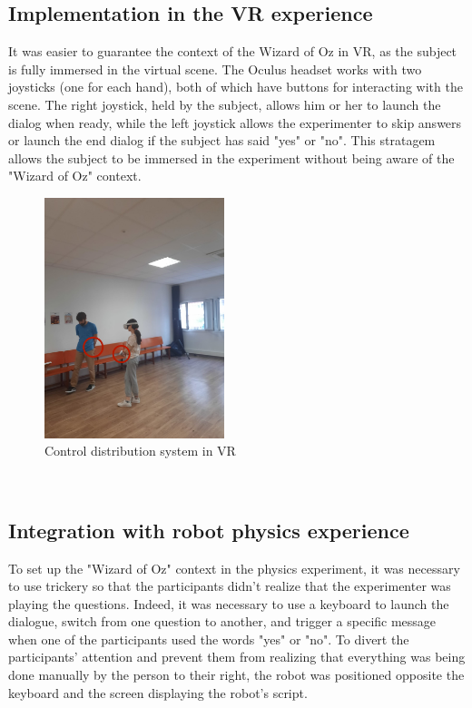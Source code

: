 \subsection{Implementation in the VR experience}
It was easier to guarantee the context of the Wizard of Oz in VR, as the subject is fully immersed in the virtual scene. The Oculus headset works with two joysticks (one for each hand), both of which have buttons for interacting with the scene. The right joystick, held by the subject, allows him or her to launch the dialog when ready, while the left joystick allows the experimenter to skip answers or launch the end dialog if the subject has said "yes" or "no". This stratagem allows the subject to be immersed in the experiment without being aware of the "Wizard of Oz" context.
\\
\begin{figure}[!h]
\centering
\includegraphics[height=7cm]{Figures/Oz_VR.jpeg}
\caption{Control distribution system in VR}
\end{figure}\\

\subsection{Integration with robot physics experience}

To set up the "Wizard of Oz" context in the physics experiment, it was necessary to use trickery so that the participants didn't realize that the experimenter was playing the questions. Indeed, it was necessary to use a keyboard to launch the dialogue, switch from one question to another, and trigger a specific message when one of the participants used the words "yes" or "no". To divert the participants' attention and prevent them from realizing that everything was being done manually by the person to their right, the robot was positioned opposite the keyboard and the screen displaying the robot's script.

